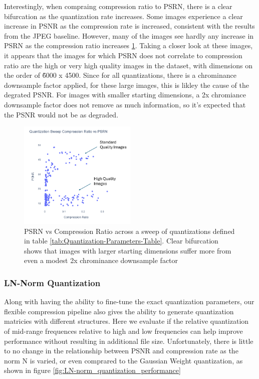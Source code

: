 Interestingly, when compraing compression ratio to PSRN, there is a clear bifurcation as the quantization rate increases. Some images experience a clear increase in PSNR as the compression rate is increased, consistent with the results from the JPEG baseline. However, many of the images see hardly any increase in PSRN as the compression ratio increases \ref{fig:gauss_quantization_vs_psnr}. Taking a closer look at these images, it appears that the images for which PSRN does not correlate to compression ratio are the high or very high quality images in the dataset, with dimensions on the order of \~ 6000 x 4500. Since for all quantizations, there is a chrominance downsample factor applied, for these large images, this is likley the cause of the degrated PSNR. For images with smaller starting dimensions, a 2x chromiance downsample factor does not remove as much information, so it's expected that the PSNR would not be as degraded.

\begin{figure}
    \includegraphics[width=0.5\textwidth]{assets/Quantization Sweep Compression Ratio vs PSRN.png}
    \caption{PSRN vs Compression Ratio across a sweep of quantizations defined in table \ref{tab:Quantization-Parameters-Table}. Clear bifurcation shows that images with larger starting dimensions suffer more from even a modest 2x chrominance downsample factor}
    \label{fig:gauss_quantization_vs_psnr}
\end{figure}

\subsubsection{LN-Norm Quantization}

Along with having the ability to fine-tune the exact quantization parameters, our flexible compression pipeline also gives the ability to generate quantization matricies with different structures. Here we evaluate if the relative quantization of mid-range frequences relative to high and low frequencies can help improve performance without resulting in additional file size. Unfortunately, there is little to no change in the relationship between PSNR and compression rate as the norm N is varied, or even comprared to the Gaussian Weight quantization, as shown in figure \ref{fig:LN-norm_quantization_performance}


